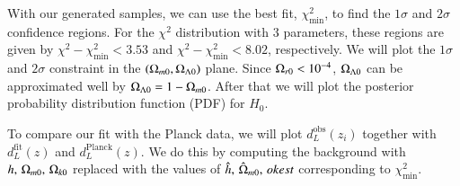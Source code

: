 With our generated samples, we can use the best fit, $\chi^2_\mathrm{min}$, to find the $1\sigma$ and $2\sigma$ confidence regions. For the $\chi^2$ distribution with $3$ parameters, these regions are given by $\chi^2 - \chi^2_\mathrm{min}<3.53$ and $\chi^2 - \chi^2_\mathrm{min}<8.02$, respectively. We will plot the $1\sigma$ and $2\sigma$ constraint in the $(\Omega_{m0},\Omega_{\Lambda 0})$ plane. Since $\Omega_{r0}<10^{-4}$, $\Omega_{\Lambda 0}$ can be approximated well by $\Omega_{\Lambda 0}=1-\Omega_{m0}$. After that we will plot the posterior probability distribution function (PDF) for $H_0$. 

To compare our fit with the Planck data, we will plot $d_L^\mathrm{obs}(z_i)$ together with $d_L^\mathrm{fit}(z)$ and $d_L^\mathrm{Planck}(z)$. We do this by computing the background with $h,\,\Omega_{m0},\,\Omega_{k0}$ replaced with the values of $\hat{h},\,\hat{\Omega}_{m0},\,okest$ corresponding to $\chi^2_\mathrm{min}$.     



